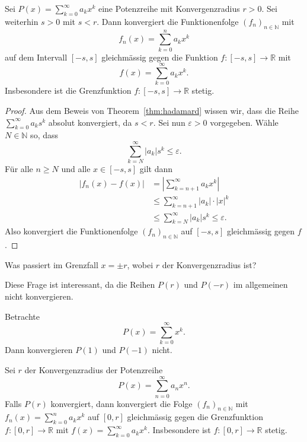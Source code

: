 \documentclass[../main.tex]{subfiles}
\begin{document}
\begin{proposition}\label{prop:power-series-uniform}
  Sei 
  \(
    P(x) = \sum_{k=0}^{\infty} a_k x^k
  \)
  eine Potenzreihe mit Konvergenzradius $r > 0$.
  Sei weiterhin $s > 0$ mit $s < r$.
  Dann konvergiert die Funktionenfolge ${(f_{n})}_{n \in \mathbb{N}}$ mit
  \[
    f_n(x) = \sum_{k=0}^{n} a_k x^k
  \]
  auf dem Intervall $[-s, s]$ gleichmässig gegen die Funktion
  $f \colon [-s, s] \to \mathbb{R}$ mit
  \[
    f(x) = \sum_{k=0}^{\infty} a_k x^k.
  \]
  Insbesondere ist die Grenzfunktion $f \colon [-s, s] \to \mathbb{R}$ stetig.
\end{proposition}


\begin{proof}
  Aus dem Beweis von Theorem~\ref{thm:hadamard} wissen wir, dass die Reihe
  \(
    \sum_{k=0}^{\infty} a_k s^k
  \)
  absolut konvergiert, da $s < r$.
  Sei nun $\varepsilon > 0$ vorgegeben.
  Wähle $N \in \mathbb{N}$ so, dass
  \[
    \sum_{k=N}^{\infty} |a_k| s^k \leq \varepsilon.
  \]
  Für alle $n \geq N$ und alle $x \in [-s, s]$ gilt dann
   \begin{align*}
     |f_n(x) - f(x)|
     & = \left| \sum_{k=n+1}^{\infty} a_k x^k \right|\\
     & \leq \sum_{k=n+1}^{\infty} |a_k| \cdot |x|^k\\
     & \leq \sum_{k=N}^{\infty} |a_k| s^k \leq \varepsilon. 
  \end{align*}
  Also konvergiert die Funktionenfolge ${(f_{n})}_{n \in \mathbb{N}}$ auf $[-s, s]$ 
  gleichmässig gegen $f$.
\end{proof}

\begin{question}
  Was passiert im Grenzfall $x = \pm r$, wobei $r$ der Konvergenzradius ist?
\end{question}

Diese Frage ist interessant, da die Reihen $P(r)$ und $P(-r)$
im allgemeinen nicht konvergieren.

\begin{example}
  Betrachte
  \[
    P(x) = \sum_{k=0}^{\infty} x^k.
  \]
  Dann konvergieren $P(1)$ und $P(-1)$ nicht.
\end{example}


\begin{proposition}\label{prop:abel-grenzwertsatz}
  Sei $r$ der Konvergenzradius der Potenzreihe
  \[
    P(x) = \sum_{n=0}^{\infty} a_n x^n.
  \]
  Falls $P(r)$ konvergiert, dann konvergiert die Folge
  ${(f_{n})}_{n \in \mathbb{N}}$ mit
  \(
    f_n(x) = \sum_{k=0}^{n}  a_k x^k
  \)
  auf $[0, r]$ gleichmässig gegen die Grenzfunktion $f \colon [0, r] \to \mathbb{R}$
  mit
  \(
    f(x) = \sum_{k=0}^{\infty} a_k x^k.
  \)
  Insbesondere ist $f \colon [0, r] \to \mathbb{R}$ stetig.
\end{proposition}
\end{document}
